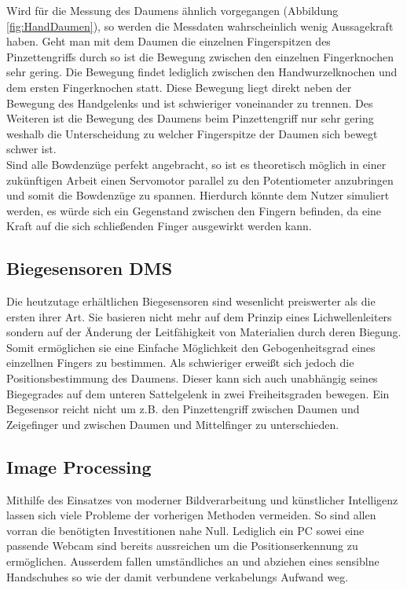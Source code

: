 \documentclass[a4paper,12pt,final]{article} %
\numberwithin{equation}{section} %
\numberwithin{figure}{section} %
\numberwithin{table}{section} %
\begin{document}
Wird für die Messung des Daumens ähnlich vorgegangen (Abbildung \ref{fig:HandDaumen}), so werden die Messdaten wahrscheinlich wenig Aussagekraft haben.
Geht man mit dem Daumen die einzelnen Fingerspitzen des Pinzettengriffs durch so ist die Bewegung zwischen den einzelnen Fingerknochen sehr gering. Die Bewegung findet lediglich zwischen den Hand\-wur\-zel\-knoch\-en und dem ersten Fingerknochen statt.
Diese Bewegung liegt direkt neben der Bewegung des Handgelenks und ist schwieriger voneinander zu trennen. Des Weiteren ist die Bewegung des Daumens beim Pinzettengriff nur sehr gering weshalb  die Unterscheidung zu welcher Fingerspitze der Daumen sich bewegt schwer ist.\\
Sind alle Bowdenzüge perfekt angebracht, so ist es theoretisch möglich in einer zukünftigen Arbeit einen Servomotor parallel zu den Potentiometer anzubringen und somit die Bowdenzüge zu spannen.
Hierdurch könnte dem Nutzer simuliert werden, es würde sich ein Gegenstand zwischen den Fingern befinden, da eine Kraft auf die sich schließenden Finger ausgewirkt werden kann.  
\subsection{Biegesensoren DMS}
Die heutzutage erhältlichen Biegesensoren sind wesenlicht preiswerter als die ersten ihrer Art. Sie basieren nicht mehr auf dem Prinzip eines Lichwellenleiters sondern auf der Änderung der Leitfähigkeit von Materialien durch deren Biegung. Somit ermöglichen sie eine Einfache Möglichkeit den Gebogenheitsgrad eines einzellnen Fingers zu bestimmen. Als schwieriger erweißt sich jedoch die Positionsbestimmung des Daumens. Dieser kann sich auch unabhängig seines Biegegrades auf dem unteren Sattelgelenk in zwei Freiheitsgraden bewegen. Ein Begesensor reicht nicht um z.B. den Pinzettengriff zwischen Daumen und Zeigefinger und zwischen Daumen und Mittelfinger zu unterschieden.

\subsection{Image Processing}
Mithilfe des Einsatzes von moderner Bildverarbeitung und künstlicher Intelligenz lassen sich viele Probleme der vorherigen Methoden vermeiden. So sind allen vorran die benötigten Investitionen nahe Null. Lediglich ein PC sowei eine passende Webcam sind bereits aussreichen um die Positionserkennung zu ermöglichen. Ausserdem fallen umständliches an und abziehen eines sensiblne Handschuhes so wie der damit verbundene verkabelungs Aufwand weg.
\end{document}
